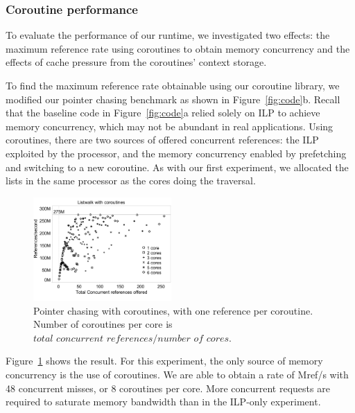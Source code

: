 \documentclass[10pt,nocopyrightspace]{sigplanconf}
\newcommand{\mrps}[1]{\unit[#1]{Mref/s}}
\begin{document}
\subsubsection{Coroutine performance}

To evaluate the performance of our runtime, we investigated two
effects: the maximum reference rate using coroutines
to obtain memory concurrency and the effects of cache pressure from the
coroutines' context storage. 

To find the maximum reference rate obtainable using our coroutine
library, we modified our pointer chasing benchmark as shown in
Figure~\ref{fig:code}b. Recall that the baseline code in Figure~\ref{fig:code}a relied solely on ILP to achieve memory concurrency, which may not be abundant in real applications. Using coroutines, there are two sources of offered
concurrent references: the ILP exploited by the processor, and the
memory concurrency enabled by prefetching and switching to a new
coroutine. As with our first experiment, we allocated the lists in the
same processor as the cores doing the traversal. 

\begin{figure}[t]
  \begin{center}
    \includegraphics[width=0.47\textwidth]{figures/multi-green-edited.pdf}
  \end{center}
  \vspace{-9pt}
  \caption{Pointer chasing with coroutines, with one reference per
    coroutine. Number of coroutines per core is $\textit{total concurrent references} / \textit{number of cores}$.}
  \label{fig:multi-green}
\end{figure}

Figure~\ref{fig:multi-green} shows the result. For this experiment,
the only source of memory concurrency is the use of coroutines. We are
able to obtain a rate of \mrps{275} with 48 concurrent misses, or 8
coroutines per core. More concurrent requests are required to saturate
memory bandwidth than in the ILP-only experiment.
\end{document}
